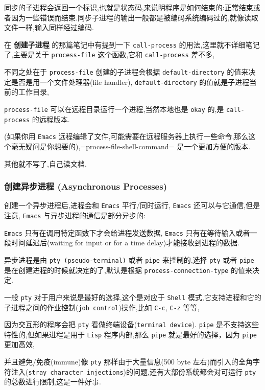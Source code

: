 \documentclass[11pt]{article}
\begin{document}
同步的子进程会返回一个标识,也就是状态码,来说明程序是如何结束的:正常结束或者因为一些错误而结束.同步子进程的输出一般都是被编码系统编码过的,就像读取文件一样,输入同样经过编码.

在 \textbf{创建子进程} 的那篇笔记中有提到一下 \texttt{call-process} 的用法,这里就不详细笔记了,主要是关于 \texttt{process-file} 这个函数,它和 \texttt{call-process} 差不多,

不同之处在于 \texttt{process-file} 创建的子进程会根据 \texttt{default-directory} 的值来决定是否是用一个文件处理器(file handler), \texttt{default-directory} 的值就是子进程当前的工作目录,

\texttt{process-file} 可以在远程目录运行一个进程,当然本地也是 \texttt{okay} 的,是 \texttt{call-process} 的远程版本.

(如果你用 \texttt{Emacs} 远程编辑了文件,可能需要在远程服务器上执行一些命令,那么这个毫无疑问是你想要的),=process-file-shell-command= 是一个更加方便的版本.

其他就不写了,自己读文档.


\subsubsection{创建异步进程 (Asynchronous Processes)}
\label{sec:org4ab1508}

创建一个异步进程后,进程会和 \texttt{Emacs} 平行/同时运行, \texttt{Emacs} 还可以与它通信,但是注意, \texttt{Emacs} 与异步进程的通信是部分异步的:

\texttt{Emacs} 只有在调用特定函数下才会给进程发送数据, \texttt{Emacs} 只有在等待输入或者一段时间延迟后(waiting for input or for a time delay)才能接收到进程的数据.

异步进程是由 \texttt{pty (pseudo-terminal)} 或者 \texttt{pipe} 来控制的,选择 \texttt{pty} 或者 \texttt{pipe} 是在创建进程的时候就决定的了,默认是根据 \texttt{process-connection-type} 的值来决定.

一般 \texttt{pty} 对于用户来说是最好的选择,这个是对应于 \texttt{Shell} 模式,它支持进程和它的子进程之间的作业控制(\texttt{job control})操作,比如 \texttt{C-c}, \texttt{C-z} 等等,

因为交互形的程序会把 \texttt{pty} 看做终端设备(\texttt{terminal device}). \texttt{pipe} 是不支持这些特性的,但如果进程是用于 \texttt{Lisp} 程序内部,那么 \texttt{pipe} 就是最好的选择，因为 \texttt{pipe} 更加高效,

并且避免/免疫(immune)像 \texttt{pty} 那样由于大量信息(500 byte 左右)而引入的全角字符注入(\texttt{stray character injections})的问题,还有大部份系统都会对可运行 \texttt{pty} 的总数进行限制,这是一件好事.
\end{document}
